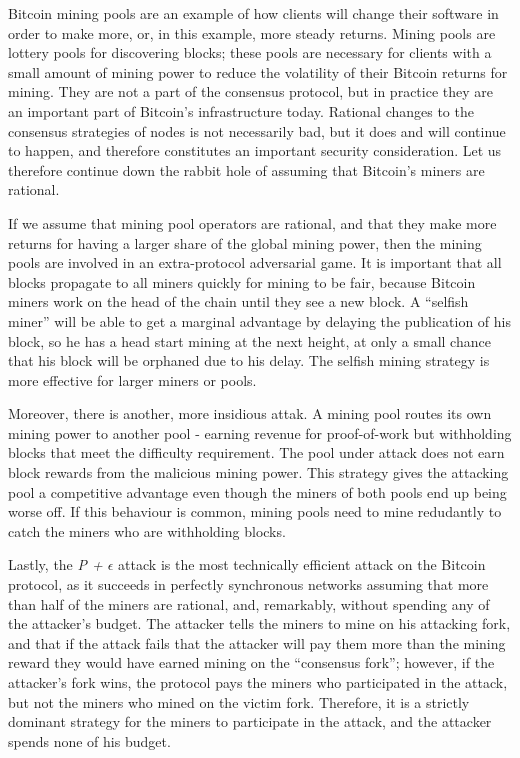 \documentclass[11pt,a4paper]{article}
\theoremstyle{plain}
\theoremstyle{definition}
\begin{document}
Bitcoin mining pools are an example of how clients will change their software in order to make more, or, in this example, more steady returns. Mining pools are lottery pools for discovering blocks; these pools are necessary for clients with a small amount of mining power to reduce the volatility of their Bitcoin returns for mining. They are not a part of the consensus protocol, but in practice they are an important part of Bitcoin's infrastructure today. Rational changes to the consensus strategies of nodes is not necessarily bad, but it does and will continue to happen, and therefore constitutes an important security consideration. Let us therefore continue down the rabbit hole of assuming that Bitcoin's miners are rational.

If we assume that mining pool operators are rational, and that they make more returns for having a larger share of the global mining power, then the mining pools are involved in an extra-protocol adversarial game. It is important that all blocks propagate to all miners quickly for mining to be fair, because Bitcoin miners work on the head of the chain until they see a new block. A ``selfish miner'' will be able to get a marginal advantage by delaying the publication of his block, so he has a head start mining at the next height, at only a small chance that his block will be orphaned due to his delay. The selfish mining strategy is more effective for larger miners or pools. \cite{SelfishMining}

Moreover, there is another, more insidious attak.  A mining pool routes its own mining power to another pool - earning revenue for proof-of-work but withholding blocks that meet the difficulty requirement. The pool under attack does not earn block rewards from the malicious mining power. This strategy gives the attacking pool a competitive advantage even though the miners of both pools end up being worse off. If this behaviour is common, mining pools need to mine redudantly to catch the miners who are withholding blocks. \cite{BlockWithholding}

Lastly, the \emph{P + $\epsilon$} attack is the most technically efficient attack on the Bitcoin protocol, as it succeeds in perfectly synchronous networks assuming that more than half of the miners are rational, and, remarkably, without spending any of the attacker's budget. The attacker tells the miners to mine on his attacking fork, and that if the attack fails that the attacker will pay them more than the mining reward they would have earned mining on the ``consensus fork''; however, if the attacker's fork wins, the protocol pays the miners who participated in the attack, but not the miners who mined on the victim fork. Therefore, it is a strictly dominant strategy for the miners to participate in the attack, and the attacker spends none of his budget. \cite{P_Plus_Epsilon}
\end{document}
